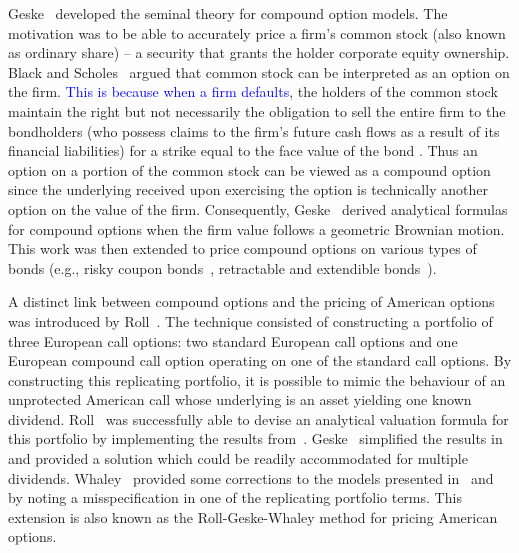 Geske~\cite{Geske1979} developed the seminal theory for compound option models. The motivation was to be able to accurately price a firm's common stock (also known as ordinary share) -- a security that grants the holder corporate equity ownership. Black and Scholes~\cite{Black1973} argued that common stock can be interpreted as an option on the firm. \textcolor{blue}{This is because when a firm defaults}, the holders of the common stock maintain the right but not necessarily the obligation to sell the entire firm to the bondholders (who possess claims to the firm's future cash flows as a result of its financial liabilities) for a strike equal to the face value of the bond \cite{Kwok2008}. Thus an option on a portion of the common stock can be viewed as a compound option since the underlying received upon exercising the option is technically another option on the value of the firm. Consequently, Geske~\cite{Geske1979} derived analytical formulas for compound options when the firm value follows a geometric Brownian motion. This work was then extended to price compound options on various types of bonds (e.g., risky coupon bonds~\cite{Geske1977}, retractable and extendible bonds~\cite{Brennan1977, Ananthanarayanan1980, Longstaff1990}).

A distinct link between compound options and the pricing of American options was introduced by Roll~\cite{Roll1977}. The technique consisted of constructing a portfolio of three European call options: two standard European call options and one European compound call option operating on one of the standard call options. By constructing this replicating portfolio, it is possible to mimic the behaviour of an unprotected American call whose underlying is an asset yielding one known dividend. Roll~\cite{Roll1977} was successfully able to devise an analytical valuation formula for this portfolio by implementing the results from~\cite{Geske1979}. Geske~\cite{Geske1979b} simplified the results in~\cite{Roll1977} and provided a solution which could be readily accommodated for multiple dividends. Whaley~\cite{Whaley1982} provided some corrections to the models presented in~\cite{Roll1977} and~\cite{Geske1979} by noting a misspecification in one of the replicating portfolio terms. This extension is also known as the Roll-Geske-Whaley method for pricing American options.

